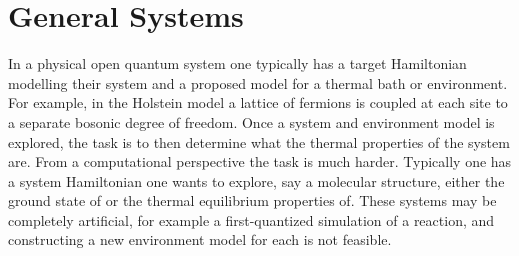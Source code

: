 \documentclass[
 amsmath,amssymb,
 aps,
onecolumn, 
nofootinbib]{revtex4-2}
\newcommand{\brackets}[1]{\left[ #1 \right]}
\newcommand{\norm}[1]{\left\| #1 \right\|}
\DeclareMathOperator{\Tr}{Tr}
\newcommand{\trace}[1]{\Tr \brackets{ #1 }}
\begin{document}






\section{General Systems} \label{sec:general_systems}

In a physical open quantum system one typically has a target Hamiltonian modelling their system and a proposed model for a thermal bath or environment. For example, in the Holstein model a lattice of fermions is coupled at each site to a separate bosonic degree of freedom. Once a system and environment model is explored, the task is to then determine what the thermal properties of the system are. From a computational perspective the task is much harder. Typically one has a system Hamiltonian one wants to explore, say a molecular structure, either the ground state of or the thermal equilibrium properties of. These systems may be completely artificial, for example a first-quantized simulation of a reaction, and constructing a new environment model for each is not feasible. 
\end{document}
